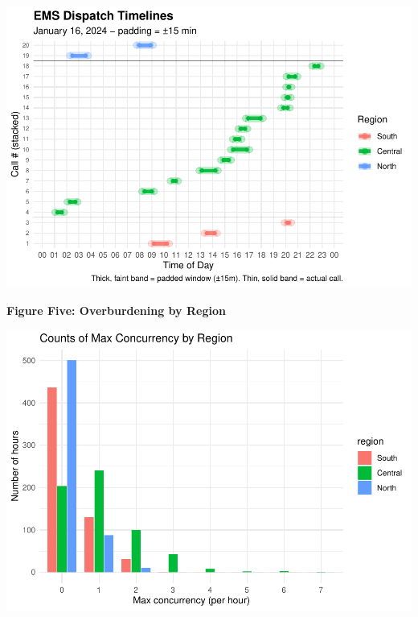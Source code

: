 \documentclass[
]{article}
\begin{document}
\includegraphics{Report_files/figure-latex/eda4-1.pdf}

\textbf{Figure Five: Overburdening by Region}

\includegraphics{Report_files/figure-latex/eda5-1.pdf}
\end{document}
